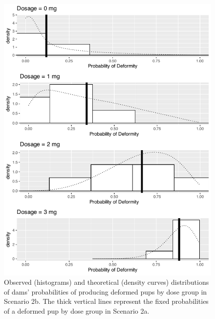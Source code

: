 \documentclass[
]{krantz}
\begin{document}
\begin{figure}

{\centering \includegraphics[width=0.6\linewidth]{bookdown-BeyondMLR_files/figure-latex/scenario2bPlot-1} 

}

\caption{Observed (histograms) and theoretical (density curves) distributions of dams' probabilities of producing deformed pups by dose group in Scenario 2b.  The thick vertical lines represent the fixed probabilities of a deformed pup by dose group in Scenario 2a.}\label{fig:scenario2bPlot}
\end{figure}

\begin{table}
\centering
\caption{\label{tab:scenario2Tab}Summary statistics of Scenario 2 by dose.}
\centering
{}
\end{table}
\end{document}
